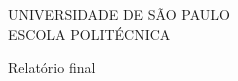 \begin{titlepage}
\centering
{\large UNIVERSIDADE DE SÃO PAULO\\[4pt]
ESCOLA POLITÉCNICA\par}

\vspace{1.2cm}
{\large \disciplina\par}

\vspace{4.5cm}
{\LARGE\bfseries \titulo\par}

\vspace{0.8cm}
{\large Relatório final\par}

\vspace{3.5cm}
{\large \autores\par}

\vfill
{\large \localdata\par}
\end{titlepage}
